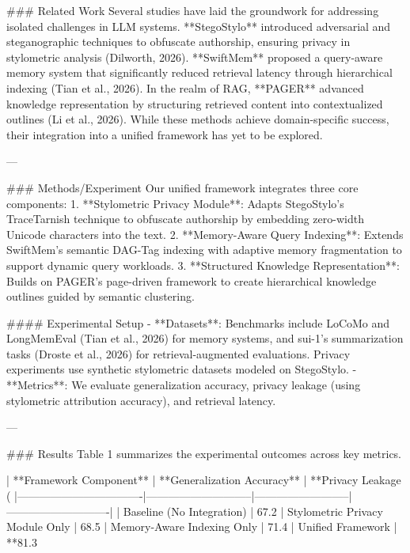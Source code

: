 ### Related Work  
Several studies have laid the groundwork for addressing isolated challenges in LLM systems. **StegoStylo** introduced adversarial and steganographic techniques to obfuscate authorship, ensuring privacy in stylometric analysis (Dilworth, 2026). **SwiftMem** proposed a query-aware memory system that significantly reduced retrieval latency through hierarchical indexing (Tian et al., 2026). In the realm of RAG, **PAGER** advanced knowledge representation by structuring retrieved content into contextualized outlines (Li et al., 2026). While these methods achieve domain-specific success, their integration into a unified framework has yet to be explored.

---

### Methods/Experiment  
Our unified framework integrates three core components:  
1. **Stylometric Privacy Module**: Adapts StegoStylo's TraceTarnish technique to obfuscate authorship by embedding zero-width Unicode characters into the text.  
2. **Memory-Aware Query Indexing**: Extends SwiftMem's semantic DAG-Tag indexing with adaptive memory fragmentation to support dynamic query workloads.  
3. **Structured Knowledge Representation**: Builds on PAGER's page-driven framework to create hierarchical knowledge outlines guided by semantic clustering.  

#### Experimental Setup  
- **Datasets**: Benchmarks include LoCoMo and LongMemEval (Tian et al., 2026) for memory systems, and sui-1's summarization tasks (Droste et al., 2026) for retrieval-augmented evaluations. Privacy experiments use synthetic stylometric datasets modeled on StegoStylo.  
- **Metrics**: We evaluate generalization accuracy, privacy leakage (using stylometric attribution accuracy), and retrieval latency.  

---

### Results  
Table 1 summarizes the experimental outcomes across key metrics.

| **Framework Component**         | **Generalization Accuracy** | **Privacy Leakage (%
|----------------------------------|-----------------------------|--------------------------|----------------------------|
| Baseline (No Integration)       | 67.2%
| Stylometric Privacy Module Only | 68.5%
| Memory-Aware Indexing Only      | 71.4%
| Unified Framework               | **81.3%

